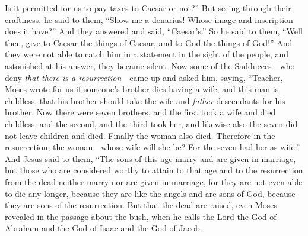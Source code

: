 \begin{biblechapter}
\verse Is it permitted for us to pay taxes to Caesar or not?”
\verse But seeing through their craftiness, he said to them,
\verse “Show me a denarius! Whose image and inscription does it have?” And they answered and said, “Caesar’s.”
\verse So he said to them, “Well then, give to Caesar the things of Caesar, and to God the things of God!”
\verse And they were not able to catch him﻿ in a statement in the sight of the people, and astonished at his answer, they became silent.
 Now some of the Sadducees—who deny \textit{that there is a resurrection}—came up and asked him,
\verse saying, “Teacher, Moses wrote for us if someone’s brother dies having a wife, and this man is childless, that his brother should take the wife and \textit{father} descendants for his brother.
\verse Now there were seven brothers, and the first took a wife and died childless,
\verse and the second,
\verse and the third took her, and likewise also the seven did not leave children and died.
\verse Finally the woman also died.
\verse Therefore in the resurrection, the woman—whose wife will she be? For the seven had her as wife.”
\verse And Jesus said to them, “The sons of this age marry and are given in marriage,
\verse but those who are considered worthy to attain to that age and to the resurrection from the dead neither marry nor are given in marriage,
\verse for they are not even able to die any longer, because they are like the angels and are sons of God, because they are sons of the resurrection.
\verse But that the dead are raised, even Moses revealed in the passage about the bush, when he calls the Lord the God of Abraham and the God of Isaac and the God of Jacob.

\end{biblechapter}
